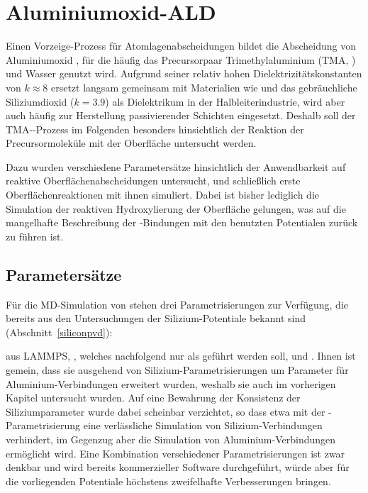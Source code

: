 \section{Aluminiumoxid-ALD}
\label{aluminaald}

Einen Vorzeige-Prozess für Atomlagenabscheidungen bildet die Abscheidung von Aluminiumoxid , für die häufig das Precursorpaar Trimethylaluminium (TMA, ) und Wasser genutzt wird\cite{puurunen_surface_2005}.
Aufgrund seiner relativ hohen Dielektrizitätskonstanten von $k\approx 8$ ersetzt  langsam gemeinsam mit Materialien wie  und \cite{smith_chemical_2000} das gebräuchliche Siliziumdioxid ($k=3.9$) als Dielektrikum in der Halbleiterindustrie, wird aber auch häufig zur Herstellung passivierender Schichten eingesetzt\cite{yun_passivation_2004,poodt_high-speed_2010}.
Deshalb soll der TMA--Prozess im Folgenden besonders hinsichtlich der Reaktion der Precursormoleküle mit der Oberfläche untersucht werden.

Dazu wurden verschiedene Parametersätze hinsichtlich der Anwendbarkeit auf reaktive Oberflächenabscheidungen untersucht, und schließlich erste Oberflächenreaktionen mit ihnen simuliert.
Dabei ist bisher lediglich die Simulation der reaktiven Hydroxylierung der Oberfläche gelungen, was auf die mangelhafte Beschreibung der -Bindungen mit den benutzten Potentialen zurück zu führen ist.

\subsection{Parametersätze}

Für die MD-Simulation von  stehen drei Parametrisierungen zur Verfügung, die bereits aus den Untersuchungen der Silizium-Potentiale bekannt sind (Abschnitt~\ref{siliconpvd}):

 aus LAMMPS\cite{plimpton_lammps_2014}, \cite{liu_development_2012}, welches nachfolgend nur als  geführt werden soll, und \cite{narayanan_reactive_2012}.
Ihnen ist gemein, dass sie ausgehend von Silizium-Parametrisierungen um Parameter für Aluminium-Verbindungen erweitert wurden, weshalb sie auch im vorherigen Kapitel untersucht wurden.
Auf eine Bewahrung der Konsistenz der Siliziumparameter wurde dabei scheinbar verzichtet, so dass etwa mit der -Parametrisierung eine verlässliche Simulation von Silizium-Verbindungen verhindert, im Gegenzug aber die Simulation von Aluminium-Verbindungen ermöglicht wird.
Eine Kombination verschiedener Parametrisierungen ist zwar denkbar und wird bereits kommerzieller Software durchgeführt\cite{biovia_materials_2014}, würde aber für die vorliegenden Potentiale höchstens zweifelhafte Verbesserungen bringen.

